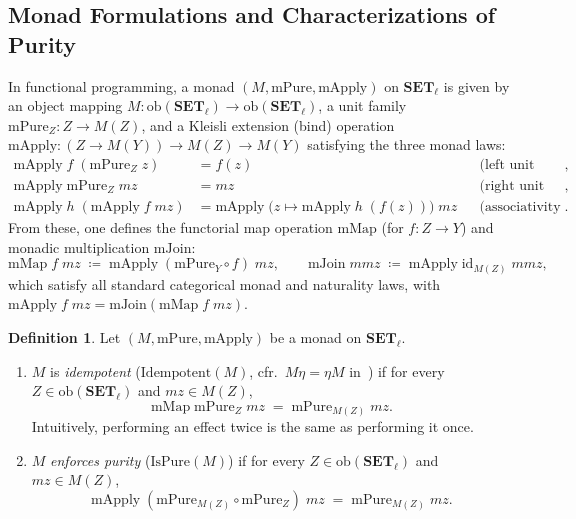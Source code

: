 \documentclass[11pt,a4paper]{article}
\theoremstyle{definition}
\newtheorem{definition}[theorem]{Definition}
\theoremstyle{remark}
\newcommand{\Set}{\mathbf{SET}}
\newcommand{\id}{\mathrm{id}}
\begin{document}
\subsection{Monad Formulations and Characterizations of Purity}

In functional programming, a monad $(M, \mathrm{mPure}, \mathrm{mApply})$ on $\Set_\ell$ is given by an
object mapping $M : \mathrm{ob}(\Set_\ell) \to \mathrm{ob}(\Set_\ell)$, a unit family
$\mathrm{mPure}_Z : Z \to M(Z)$, and a Kleisli extension (bind) operation
$\mathrm{mApply} : (Z \to M(Y)) \to M(Z) \to M(Y)$ satisfying the three monad laws:
\begin{align}
  \mathrm{mApply}\;f\;(\mathrm{mPure}_Z\;z) &= f(z)
    &&\text{(left unit law)}, \label{eq:monad-left-unit} \\
  \mathrm{mApply}\;\mathrm{mPure}_Z\;mz &= mz
    &&\text{(right unit law)}, \label{eq:monad-right-unit} \\
  \mathrm{mApply}\;h\;(\mathrm{mApply}\;f\;mz) &= \mathrm{mApply}\;\bigl(z \mapsto \mathrm{mApply}\;h\;(f(z))\bigr)\;mz
    &&\text{(associativity law)}. \label{eq:monad-assoc}
\end{align}
From these, one defines the functorial map operation $\mathrm{mMap}$ (for $f : Z \to Y$) and monadic
multiplication $\mathrm{mJoin}$:
\begin{equation}\label{eq:mmap-mjoin}
  \mathrm{mMap}\;f\;mz \;\coloneqq\; \mathrm{mApply}\;(\mathrm{mPure}_Y \circ f)\;mz,
  \qquad
  \mathrm{mJoin}\;mmz \;\coloneqq\; \mathrm{mApply}\;\id_{M(Z)}\;mmz,
\end{equation}
which satisfy all standard categorical monad and naturality laws, with
$\mathrm{mApply}\;f\;mz = \mathrm{mJoin}(\mathrm{mMap}\;f\;mz)$.

\begin{definition}\label{def:idempotent}
Let $(M, \mathrm{mPure}, \mathrm{mApply})$ be a monad on $\Set_\ell$.
\begin{enumerate}[label=(\roman*),nosep]
  \item $M$ is \emph{idempotent} ($\mathrm{Idempotent}(M)$, cfr.\ $M\eta = \eta M$ in~\cite{Borceux1994,nLabIdempotentMonad})
  if for every $Z \in \mathrm{ob}(\Set_\ell)$ and $mz \in M(Z)$,
  \begin{equation}\label{eq:idempotent}
    \mathrm{mMap}\;\mathrm{mPure}_Z\;mz \;=\; \mathrm{mPure}_{M(Z)}\;mz.
  \end{equation}
  Intuitively, performing an effect twice is the same as performing it once.
  \item $M$ \emph{enforces purity} ($\mathrm{IsPure}(M)$) if for every $Z \in \mathrm{ob}(\Set_\ell)$ and
  $mz \in M(Z)$,
  \begin{equation}\label{eq:ispure}
    \mathrm{mApply}\;(\mathrm{mPure}_{M(Z)} \circ \mathrm{mPure}_Z)\;mz \;=\; \mathrm{mPure}_{M(Z)}\;mz.
  \end{equation}
\end{enumerate}
\end{definition}
\end{document}
